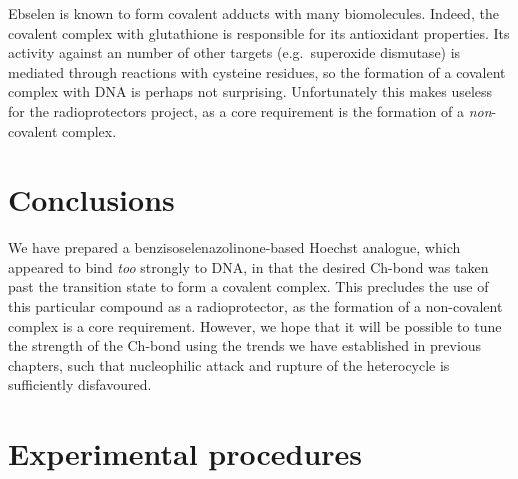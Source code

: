 \begin{refsection}
\begin{figure}
\end{figure}

Ebselen is known to form covalent adducts with many biomolecules.
Indeed, the covalent complex with glutathione is responsible for its antioxidant properties.\autocite{Antony2011}
Its activity against an number of other targets (e.g.\ superoxide dismutase\autocite{Capper2018}) is mediated through reactions with cysteine residues, so the formation of a covalent complex with DNA is perhaps not surprising.
Unfortunately this makes  useless for the radioprotectors project, as a core requirement is the formation of a \emph{non}-covalent complex.

\section{Conclusions}
We have prepared a benzisoselenazolinone-based Hoechst analogue, which appeared to bind \emph{too} strongly to DNA, in that the desired Ch-bond was taken past the transition state to form a covalent complex.
This precludes the use of this particular compound as a radioprotector, as the formation of a non-covalent complex is a core requirement.
However, we hope that it will be possible to tune the strength of the Ch-bond using the trends we have established in previous chapters, such that nucleophilic attack and rupture of the heterocycle is sufficiently disfavoured.

\section{Experimental procedures}

\end{refsection}
